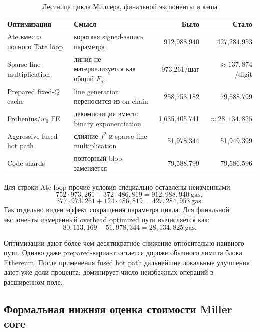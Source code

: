 \documentclass[12pt,a4paper]{article}
\newcommand{\Gas}{\mathrm{gas}}
\newcommand{\code}[1]{\texttt{\detokenize{#1}}}
\begin{document}
\begin{table}[htbp]
\centering
\caption{Лестница цикла Миллера, финальной экспоненты и кэша}
\small
\begin{tabularx}{\linewidth}{Y Y r r}
\toprule
Оптимизация & Смысл & Было & Стало \\
\midrule
Ate вместо полного Tate loop & короткая signed-запись параметра &
912,988,940 & 427,284,953 \\
Sparse line multiplication & линия не материализуется как общий $F_{q^4}$ &
973,261/шаг & $\approx137,874$/digit \\
Prepared fixed-$Q$ cache & line generation переносится из on-chain &
258,753,182 & 79,588,799 \\
Frobenius/$w_0$ FE & декомпозиция вместо binary exponentiation &
1,635,405,741 & $\approx28,134,825$ \\
Aggressive fused hot path & слияние $f^2$ и sparse line multiplication &
51,978,344 & 51,949,399 \\
Code-shards & повторный blob заменяется \code{EXTCODECOPY} &
79,588,799 & 79,586,596 \\
\bottomrule
\end{tabularx}
\end{table}

Для строки Ate loop прочие условия специально оставлены неизменными:
\[
    752\cdot973{,}261+372\cdot486{,}819
    =912{,}988{,}940\ \Gas,
\]
\[
    377\cdot973{,}261+124\cdot486{,}819
    =427{,}284{,}953\ \Gas.
\]
Так отдельно виден эффект сокращения параметра цикла. Для финальной
экспоненты измеренный overhead optimized пути вычисляется как:
\[
    80{,}113{,}169-51{,}978{,}344
    =28{,}134{,}825\ \Gas.
\]

Оптимизации дают более чем десятикратное снижение относительно наивного пути.
Однако даже prepared-вариант остается дороже обычного лимита блока Ethereum.
После применения fused hot path дальнейшие локальные улучшения дают уже доли
процента: доминирует число неизбежных операций в расширенном поле.

\subsection{Формальная нижняя оценка стоимости Miller core}
\end{document}

